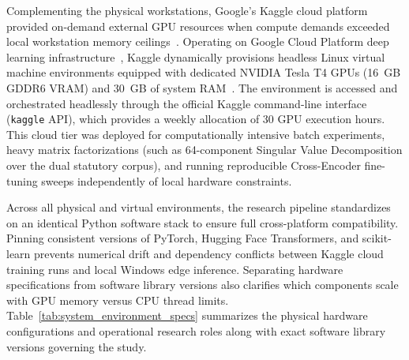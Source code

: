     Complementing the physical workstations, Google's Kaggle cloud platform provided on-demand external GPU resources when compute demands exceeded local workstation memory ceilings~\cite{kaggle2026}. Operating on Google Cloud Platform deep learning infrastructure~\cite{bisong2019kaggle}, Kaggle dynamically provisions headless Linux virtual machine environments equipped with dedicated NVIDIA Tesla T4 GPUs (16~GB GDDR6 VRAM) and 30~GB of system RAM~\cite{kaggle2026}. The environment is accessed and orchestrated headlessly through the official Kaggle command-line interface (\texttt{kaggle} API), which provides a weekly allocation of 30 GPU execution hours. This cloud tier was deployed for computationally intensive batch experiments, heavy matrix factorizations (such as 64-component Singular Value Decomposition over the dual statutory corpus), and running reproducible Cross-Encoder fine-tuning sweeps independently of local hardware constraints.

    Across all physical and virtual environments, the research pipeline standardizes on an identical Python software stack to ensure full cross-platform compatibility. Pinning consistent versions of PyTorch, Hugging Face Transformers, and scikit-learn prevents numerical drift and dependency conflicts between Kaggle cloud training runs and local Windows edge inference. Separating hardware specifications from software library versions also clarifies which components scale with GPU memory versus CPU thread limits. Table~\ref{tab:system_environment_specs} summarizes the physical hardware configurations and operational research roles along with exact software library versions governing the study.

